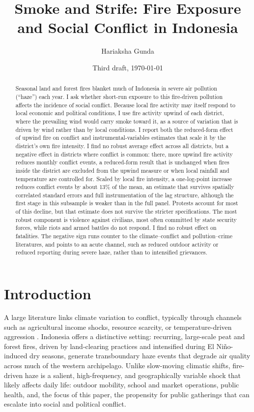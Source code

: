 \documentclass[12pt]{article}
\title{Smoke and Strife: Fire Exposure and Social Conflict in Indonesia}
\author{Hariaksha Gunda}
\affil{The University of Alabama}
\date{Third draft, \today}
\begin{document}
\maketitle

\begin{abstract}
Seasonal land and forest fires blanket much of Indonesia in severe air pollution (``haze'') each year. I ask whether short-run exposure to this fire-driven pollution affects the incidence of social conflict. Because local fire activity may itself respond to local economic and political conditions, I use fire activity upwind of each district, where the prevailing wind would carry smoke toward it, as a source of variation that is driven by wind rather than by local conditions. I report both the reduced-form effect of upwind fire on conflict and instrumental-variables estimates that scale it by the district's own fire intensity. I find no robust average effect across all districts, but a negative effect in districts where conflict is common: there, more upwind fire activity reduces monthly conflict events, a reduced-form result that is unchanged when fires inside the district are excluded from the upwind measure or when local rainfall and temperature are controlled for. Scaled by local fire intensity, a one-log-point increase reduces conflict events by about 13\% of the mean, an estimate that survives spatially correlated standard errors and full instrumentation of the lag structure, although the first stage in this subsample is weaker than in the full panel. Protests account for most of this decline, but that estimate does not survive the stricter specifications. The most robust component is violence against civilians, most often committed by state security forces, while riots and armed battles do not respond. I find no robust effect on fatalities. The negative sign runs counter to the climate--conflict and pollution--crime literatures, and points to an acute channel, such as reduced outdoor activity or reduced reporting during severe haze, rather than to intensified grievances.
\end{abstract}

\section{Introduction}

A large literature links climate variation to conflict, typically through channels such as agricultural income shocks, resource scarcity, or temperature-driven aggression \citep{hsiang2013quantifying}. Indonesia offers a distinctive setting: recurring, large-scale peat and forest fires, driven by land-clearing practices and intensified during El Ni\~{n}o-induced dry seasons, generate transboundary haze events that degrade air quality across much of the western archipelago. Unlike slow-moving climatic shifts, fire-driven haze is a salient, high-frequency, and geographically variable shock that likely affects daily life: outdoor mobility, school and market operations, public health, and, the focus of this paper, the propensity for public gatherings that can escalate into social and political conflict.
\end{document}
